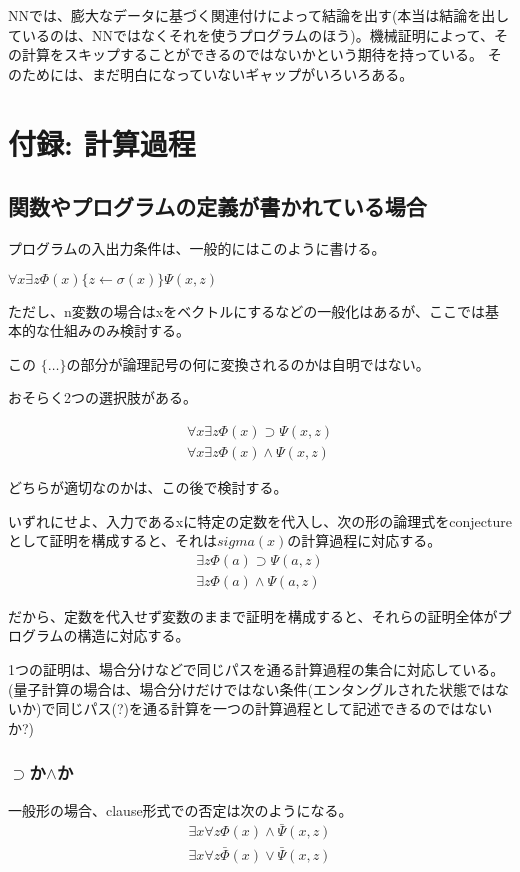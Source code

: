 \documentclass[10pt, oneside]{jarticle}   	%
\theoremstyle{definition}
\begin{document}
NNでは、膨大なデータに基づく関連付けによって結論を出す(本当は結論を出しているのは、NNではなくそれを使うプログラムのほう)。機械証明によって、その計算をスキップすることができるのではないかという期待を持っている。
そのためには、まだ明白になっていないギャップがいろいろある。


\newpage
\section{付録: 計算過程}
\subsection{関数やプログラムの定義が書かれている場合}
プログラムの入出力条件は、一般的にはこのように書ける。

$\forall x \exists z \Phi(x) \{ z \leftarrow \sigma(x) \} \Psi(x,z)$

ただし、n変数の場合はxをベクトルにするなどの一般化はあるが、ここでは基本的な仕組みのみ検討する。

この $\{\dots\}$の部分が論理記号の何に変換されるのかは自明ではない。

おそらく2つの選択肢がある。

\begin{eqnarray}
 \forall x \exists z \Phi(x) \supset \Psi(x,z) \\
 \forall x \exists z \Phi(x) \land \Psi(x,z)
\end{eqnarray}

どちらが適切なのかは、この後で検討する。



いずれにせよ、入力であるxに特定の定数を代入し、次の形の論理式をconjectureとして証明を構成すると、それは$sigma(x)$の計算過程に対応する。
\begin{eqnarray} 
 \exists z \Phi(a) \supset \Psi(a,z) \\
 \exists z \Phi(a) \land \Psi(a,z)
\end{eqnarray}

だから、定数を代入せず変数のままで証明を構成すると、それらの証明全体がプログラムの構造に対応する。

1つの証明は、場合分けなどで同じパスを通る計算過程の集合に対応している。
(量子計算の場合は、場合分けだけではない条件(エンタングルされた状態ではないか)で同じパス(?)を通る計算を一つの計算過程として記述できるのではないか?)


\subsubsection{$\supset$か$\land$か}
一般形の場合、clause形式での否定は次のようになる。
\begin{eqnarray}
 \exists x \forall z \Phi(x) \land \bar{\Psi}(x,z) \\
 \exists x \forall z \bar{\Phi}(x) \lor \bar{\Psi}(x,z)
\end{eqnarray}
\end{document}

